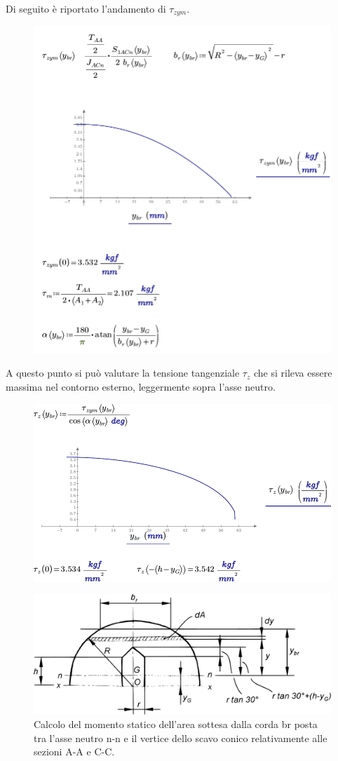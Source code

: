 Di seguito è riportato l'andamento di $\tau_{zym}$.
\begin{figure}[H]
\centering
  \includegraphics[width=.65\textwidth]{imgs/MathAsse4_1}
\caption{}
\label{fig:MathAsse4_1}
\end{figure}
A questo punto si può valutare la tensione tangenziale $\tau_z$ che si rileva essere massima nel contorno esterno, leggermente sopra l'asse neutro. 
\begin{figure}[H]
\centering
  \includegraphics[width=.65\textwidth]{imgs/MathAsse4_2}
\caption{}
\label{fig:MathAsse4_2}
\end{figure}

\begin{figure}[H]
\centering
  \includegraphics[width=.45\textwidth]{imgs/Cap7/SezAsse8}
\caption{Calcolo del momento statico dell’area sottesa dalla corda br posta tra l’asse neutro n-n e il vertice dello scavo conico relativamente alle sezioni A-A e C-C.}
\label{fig:SezAsse8}
\end{figure}


